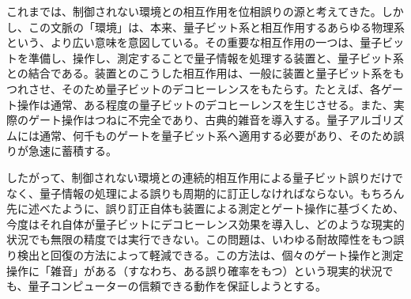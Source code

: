 これまでは、制御されない環境との相互作用を位相誤りの源と考えてきた。しかし、この文脈の「環境」は、本来、量子ビット系と相互作用するあらゆる物理系という、より広い意味を意図している。その重要な相互作用の一つは、量子ビットを準備し、操作し、測定することで量子情報を処理する装置と、量子ビット系との結合である。装置とのこうした相互作用は、一般に装置と量子ビット系をもつれさせ、そのため量子ビットのデコヒーレンスをもたらす。たとえば、各ゲート操作は通常、ある程度の量子ビットのデコヒーレンスを生じさせる。また、実際のゲート操作はつねに不完全であり、古典的雑音を導入する。量子アルゴリズムには通常、何千ものゲートを量子ビット系へ適用する必要があり、そのため誤りが急速に蓄積する。

したがって、制御されない環境との連続的相互作用による量子ビット誤りだけでなく、量子情報の処理による誤りも周期的に訂正しなければならない。もちろん先に述べたように、誤り訂正自体も装置による測定とゲート操作に基づくため、今度はそれ自体が量子ビットにデコヒーレンス効果を導入し、どのような現実的状況でも無限の精度では実行できない。この問題は、いわゆる耐故障性をもつ誤り検出と回復の方法\cite{ref362,ref363,ref364,ref365,ref366}によって軽減できる。この方法は、個々のゲート操作と測定操作に「雑音」がある（すなわち、ある誤り確率をもつ）という現実的状況でも、量子コンピューターの信頼できる動作を保証しようとする。
